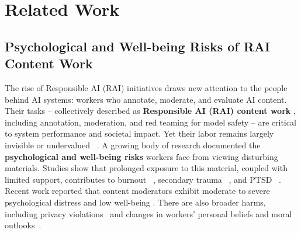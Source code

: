 \section{Related Work}



\subsection{Psychological and Well-being Risks of RAI Content Work} 
The rise of Responsible AI (RAI) initiatives draws new attention to the people behind AI systems: workers who annotate, moderate, and evaluate AI content. Their tasks -- collectively described as \textbf{Responsible AI (RAI) content work} \cite{qian2025aura}, including annotation, moderation, and red teaming for model safety -- are critical to system performance and societal impact. Yet their labor remains largely invisible or undervalued ~\cite{gray2019ghost}. 
A growing body of research documented the \textbf{psychological and well-being risks} workers face from viewing disturbing materials. Studies show that prolonged exposure to this material, coupled with limited support, contributes to burnout ~\cite{dosono2019moderation}, secondary trauma ~\cite{martinez2024secondary}, and PTSD ~\cite{steiger_psychological_2021, alemadi2024emotional, Michel2018ExContentMS, ruckenstein_re-humanizing_2020, Dwoskin_2019, arsht_2018_human}. Recent work reported that content moderators exhibit moderate to severe psychological distress and low well-being \cite{Spence2025ContentModeratorMentalHealth}. There are also broader harms, including privacy violations~\cite{pinchevski2023social, schopke-gonzalez_why_2022} and changes in workers’ personal beliefs and moral outlooks~\cite{newton_trauma_2019, Stackpole_2022, Douek_2021}. 


